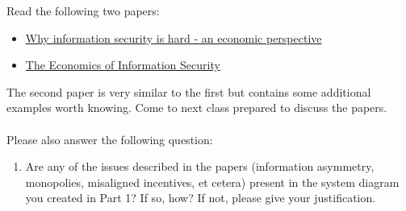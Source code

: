 \documentclass[11pt]{article}
\begin{document}
Read the following two papers:
\begin{itemize}
    \item \href{https://ieeexplore.ieee.org/abstract/document/991552}{Why information security is hard - an economic perspective}
    \item \href{https://www.science.org/doi/full/10.1126/science.1130992}{The Economics of Information Security}
\end{itemize}

The second paper is very similar to the first but contains some additional examples worth knowing.
Come to next class prepared to discuss the papers.
\\ \\
Please also answer the following question:

\begin{enumerate}
    \item Are any of the issues described in the papers (information asymmetry, monopolies, misaligned incentives, et cetera) present in the system diagram you created in Part 1? If so, how? If not, please give your justification.
\end{enumerate}






\end{document}
